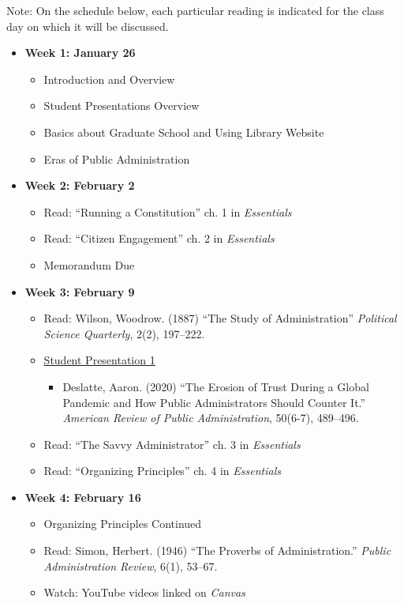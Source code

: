 \documentclass[11pt]{article}
\begin{document}
\noindent Note: On the schedule below, each particular reading is indicated for the class day on which it will be discussed. 
\begin{itemize}
	\item[] \textbf{Week 1: January 26} 
	\begin{itemize}
		\item Introduction and Overview
		\item Student Presentations Overview
		\item Basics about Graduate School and Using Library Website
		\item Eras of Public Administration
	\end{itemize}
	
	\item[] \textbf{Week 2: February 2} 
	\begin{itemize}
		\item Read: ``Running a Constitution'' ch. 1 in \emph{Essentials}
		\item Read: ``Citizen Engagement'' ch. 2 in \emph{Essentials}
		\item Memorandum Due
		
	\end{itemize}
	
	\item[] \textbf{Week 3: February 9} 
	\begin{itemize}
		\item Read: Wilson, Woodrow. (1887) ``The Study of Administration'' \emph{Political Science Quarterly}, 2(2), 197--222.
		\item \underline{Student Presentation 1}
		\begin{itemize}
			\item Deslatte, Aaron. (2020) ``The Erosion of Trust During a Global Pandemic and How Public Administrators Should Counter It.'' \emph{American Review of Public Administration}, 50(6-7), 489--496. 
		\end{itemize}	
		\item Read: ``The Savvy Administrator'' ch. 3 in \emph{Essentials}
		\item Read: ``Organizing Principles'' ch. 4 in \emph{Essentials}
	\end{itemize}
	
	\item[] \textbf{Week 4: February 16} 
	\begin{itemize}
		\item Organizing Principles Continued
		\item Read: Simon, Herbert. (1946) ``The Proverbs of Administration.'' \textit{Public Administration Review}, 6(1), 53--67. 
		\item Watch: YouTube videos linked on \emph{Canvas}
	\end{itemize}
	

\end{itemize}
\end{document}
